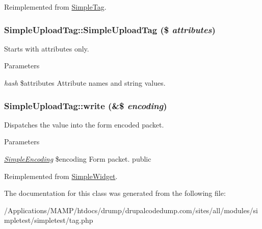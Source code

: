 Reimplemented from \hyperlink{class_simple_tag_a158fcbf8b82e7a6f7b6855c1dbe0715b}{SimpleTag}.\hypertarget{class_simple_upload_tag_ac5cdee40b873170a2efce4be218a6a2e}{
\subsubsection[{SimpleUploadTag}]{\setlength{\rightskip}{0pt plus 5cm}SimpleUploadTag::SimpleUploadTag (\$ {\em attributes})}}
\label{class_simple_upload_tag_ac5cdee40b873170a2efce4be218a6a2e}
Starts with attributes only. 
\begin{DoxyParams}{Parameters}
\item[{\em hash}]\$attributes Attribute names and string values. \end{DoxyParams}
\hypertarget{class_simple_upload_tag_a0d75761c4b47163eff52715789037595}{
\subsubsection[{write}]{\setlength{\rightskip}{0pt plus 5cm}SimpleUploadTag::write (\&\$ {\em encoding})}}
\label{class_simple_upload_tag_a0d75761c4b47163eff52715789037595}
Dispatches the value into the form encoded packet. 
\begin{DoxyParams}{Parameters}
\item[{\em \hyperlink{class_simple_encoding}{SimpleEncoding}}]\$encoding Form packet.  public \end{DoxyParams}


Reimplemented from \hyperlink{class_simple_widget_a5e546ea2ab317409554f80ba2313f7f2}{SimpleWidget}.

The documentation for this class was generated from the following file:\begin{DoxyCompactItemize}
\item 
/Applications/MAMP/htdocs/drump/drupalcodedump.com/sites/all/modules/simpletest/simpletest/tag.php\end{DoxyCompactItemize}
